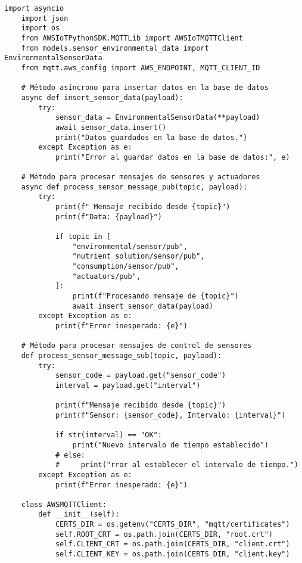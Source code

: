 
\begin{lstlisting}[label=cod:mqtt_connection,caption=Cliente MQTT, language=PythonUTF8]
    import asyncio
    import json
    import os
    from AWSIoTPythonSDK.MQTTLib import AWSIoTMQTTClient
    from models.sensor_environmental_data import EnvironmentalSensorData
    from mqtt.aws_config import AWS_ENDPOINT, MQTT_CLIENT_ID
    
    # Método asíncrono para insertar datos en la base de datos
    async def insert_sensor_data(payload):
        try:
            sensor_data = EnvironmentalSensorData(**payload)
            await sensor_data.insert()
            print("Datos guardados en la base de datos.")
        except Exception as e:
            print("Error al guardar datos en la base de datos:", e)
    
    # Método para procesar mensajes de sensores y actuadores
    async def process_sensor_message_pub(topic, payload):
        try:
            print(f" Mensaje recibido desde {topic}")
            print(f"Data: {payload}")
    
            if topic in [
                "environmental/sensor/pub",
                "nutrient_solution/sensor/pub",
                "consumption/sensor/pub",
                "actuators/pub",
            ]:
                print(f"Procesando mensaje de {topic}")
                await insert_sensor_data(payload)
        except Exception as e:
            print(f"Error inesperado: {e}")
    
    # Método para procesar mensajes de control de sensores
    def process_sensor_message_sub(topic, payload):
        try:
            sensor_code = payload.get("sensor_code")
            interval = payload.get("interval")
    
            print(f"Mensaje recibido desde {topic}")
            print(f"Sensor: {sensor_code}, Intervalo: {interval}")
    
            if str(interval) == "OK":
                print("Nuevo intervalo de tiempo establecido")
            # else:
            #     print("rror al establecer el intervalo de tiempo.")
        except Exception as e:
            print(f"Error inesperado: {e}")
    
    class AWSMQTTClient:
        def __init__(self):
            CERTS_DIR = os.getenv("CERTS_DIR", "mqtt/certificates")
            self.ROOT_CRT = os.path.join(CERTS_DIR, "root.crt")
            self.CLIENT_CRT = os.path.join(CERTS_DIR, "client.crt")
            self.CLIENT_KEY = os.path.join(CERTS_DIR, "client.key")
    

\end{lstlisting}
